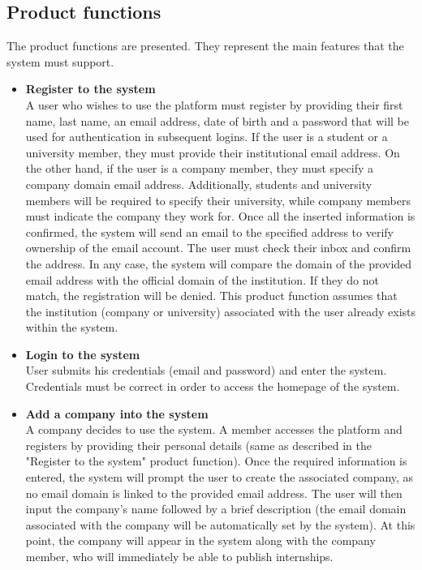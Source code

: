 \subsection{Product functions}
The product functions are presented. They represent the main features that the system must support.
\begin{itemize}
      \item \textbf{Register to the system} \\
      A user who wishes to use the platform must register by providing their first name, last name, an email address, date of birth and a password that will be used for authentication in subsequent logins. If the user is a student or a university member, they must provide their institutional email address. On the other hand, if the user is a company member, they must specify a company domain email address.
      Additionally, students and university members will be required to specify their university, while company members must indicate the company they work for. Once all the inserted information is confirmed, the system will send an email to the specified address to verify ownership of the email account. The user must check their inbox and confirm the address.
      In any case, the system will compare the domain of the provided email address with the official domain of the institution. If they do not match, the registration will be denied. This product function assumes that the institution (company or university) associated with the user already exists within the system.

      \item \textbf{Login to the system} \\
      User submits his credentials (email and password) and enter the system. Credentials must be correct in order to access the homepage of the system.
      
      \item \textbf{Add a company into the system} \\
      A company decides to use the system. A member accesses the platform and registers by providing their personal details (same as described in the "Register to the system" product function). Once the required information is entered, the system will prompt the user to create the associated company, as no email domain is linked to the provided email address. The user will then input the company's name followed by a brief description (the email domain associated with the company will be automatically set by the system). At this point, the company will appear in the system along with the company member, who will immediately be able to publish internships.


\end{itemize}
